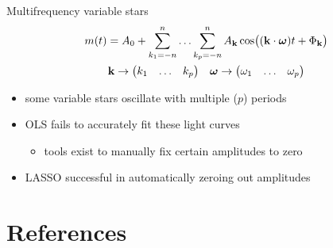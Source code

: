 \documentclass{beamer}
\begin{document}
\begin{frame}{Multifrequency variable stars}
  \begin{gather*}
    m(t) =
    A_0 +
    \sum_{k_1=-n}^n \ldots \sum_{k_p=-n}^n
    A_{\vb{k}} \cos((\vb{k} \cdot \boldsymbol\omega) t + \Phi_{\vb{k}})
    \\
    \vb{k} \to \mqty( k_1 & \ldots & k_p )
    \quad
    \boldsymbol\omega \to \mqty( \omega_1 & \ldots & \omega_p )
  \end{gather*}
  \begin{itemize}
  \item some variable stars oscillate with multiple ($p$) periods
  \item OLS fails to accurately fit these light curves
    \begin{itemize}
    \item tools exist to manually fix certain amplitudes to zero
    \end{itemize}
  \item LASSO successful in automatically zeroing out amplitudes
  \end{itemize}

  \centering
  \textcite{2015arXiv151200004B}
\end{frame}

\section{References}

\begin{frame}[allowframebreaks]

\printbibliography[heading=subbibliography]

\end{frame}
\end{document}
